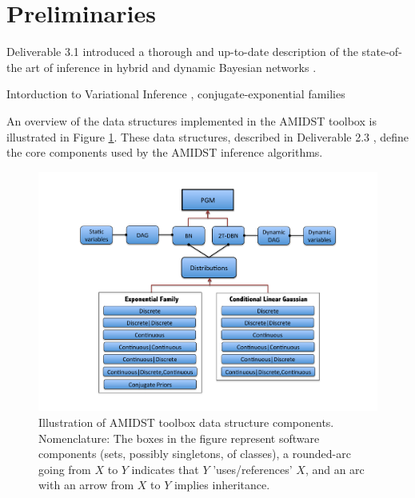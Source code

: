 \section{Preliminaries} \label{sec:Preliminaries} 

Deliverable 3.1 introduced a thorough and up-to-date description of the state-of-the art of inference in hybrid and dynamic Bayesian networks \cite{Deliverable 3.1}.

Intorduction to Variational Inference \cite{Jordan1999,Attias2000}, conjugate-exponential families \cite{Attias2000,Beal2003,Bishop2005}

An overview of the data structures implemented in the AMIDST toolbox is illustrated in Figure \ref{Figure:ToolboxDataStructures}. These data structures, described in Deliverable 2.3 \cite{Deliverable2.3}, define the core components used by the AMIDST inference algorithms. 


\begin{figure}[ht!]
\begin{center}
\includegraphics[width=\linewidth]{./figures/DataStructure}
\vspace{-0.5in}
\caption{\label{Figure:ToolboxDataStructures} Illustration of AMIDST toolbox data structure components. Nomenclature: The boxes in the
      figure represent software components (sets, possibly singletons, of classes), a rounded-arc going from $X$ to $Y$ indicates that $Y$ 'uses/references' $X$, and an arc with an arrow from $X$ to $Y$ implies inheritance.}
\end{center}
\end{figure}